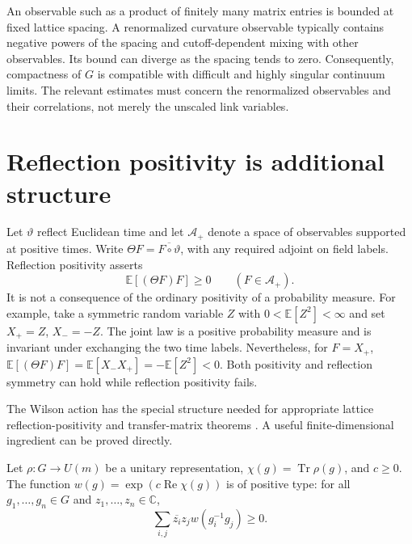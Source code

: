 An observable such as a product of finitely many matrix entries is bounded
at fixed lattice spacing.  A renormalized curvature observable typically
contains negative powers of the spacing and cutoff-dependent mixing with
other observables.  Its bound can diverge as the spacing tends to zero.
Consequently, compactness of $G$ is compatible with difficult and highly
singular continuum limits.  The relevant estimates must concern the
renormalized observables and their correlations, not merely the unscaled
link variables.

\section{Reflection positivity is additional structure}

Let $\vartheta$ reflect Euclidean time and let $\mathcal A_+$ denote a
space of observables supported at positive times.  Write
$\Theta F=\overline{F\circ\vartheta}$, with any required adjoint on
field labels.  Reflection positivity asserts
\begin{equation}
 \mathbb E[(\Theta F)F]\geq0\qquad(F\in\mathcal A_+).
 \label{eq:reflection-positive}
\end{equation}
It is not a consequence of the ordinary positivity of a probability measure.
For example, take a symmetric random variable $Z$ with
$0<\mathbb E[Z^2]<\infty$ and set $X_+=Z$, $X_-=-Z$.
The joint law is a positive probability measure and is invariant under
exchanging the two time labels.  Nevertheless, for $F=X_+$,
$\mathbb E[(\Theta F)F]=\mathbb E[X_-X_+]=-\mathbb E[Z^2]<0$.
Both positivity and reflection symmetry can hold while reflection positivity
fails.

The Wilson action has the special structure needed for appropriate lattice
reflection-positivity and transfer-matrix theorems
\cite{OSSeiler1978,Luscher1977}.  A useful finite-dimensional ingredient
can be proved directly.

\begin{proposition}
Let $\rho:G\to U(m)$ be a unitary representation, $\chi(g)=\operatorname{Tr}\rho(g)$,
and $c\geq0$.  The function $w(g)=\exp(c\operatorname{Re}\chi(g))$
is of positive type: for all $g_1,\ldots,g_n\in G$ and
$z_1,\ldots,z_n\in\mathbb C$,
\[
 \sum_{i,j}\overline{z_i}z_jw(g_i^{-1}g_j)\geq0.
\]
\end{proposition}

